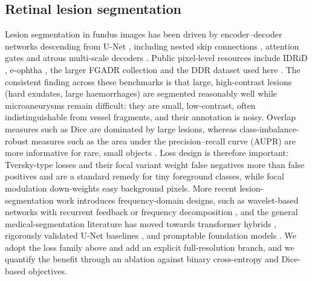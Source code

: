 \subsection{Retinal lesion segmentation}
Lesion segmentation in fundus images has been driven by encoder--decoder networks descending from U-Net \citep{ronneberger2015}, including nested skip connections \citep{zhou2020unetpp}, attention gates \citep{oktay2018} and atrous multi-scale decoders \citep{chen2018deeplab}. Public pixel-level resources include IDRiD \citep{porwal2020idrid}, e-ophtha \citep{decenciere2013teleophta}, the larger FGADR collection \citep{zhou2021fgadr} and the DDR dataset used here \citep{li2019ddr}. The consistent finding across these benchmarks is that large, high-contrast lesions (hard exudates, large haemorrhages) are segmented reasonably well while microaneurysms remain difficult: they are small, low-contrast, often indistinguishable from vessel fragments, and their annotation is noisy. Overlap measures such as Dice are dominated by large lesions, whereas class-imbalance-robust measures such as the area under the precision--recall curve (AUPR) are more informative for rare, small objects \citep{saito2015pr}. Loss design is therefore important: Tversky-type losses \citep{salehi2017tversky} and their focal variant \citep{abraham2019ftl} weight false negatives more than false positives and are a standard remedy for tiny foreground classes, while focal modulation \citep{lin2017focal} down-weights easy background pixels. More recent lesion-segmentation work introduces frequency-domain designs, such as wavelet-based networks with recurrent feedback or frequency decomposition \citep{li2024wsrfnet,li2026wfdenet}, and the general medical-segmentation literature has moved towards transformer hybrids \citep{chen2024transunet}, rigorously validated U-Net baselines \citep{isensee2024nnunetrev}, and promptable foundation models \citep{kirillov2023sam,ma2024medsam}. We adopt the loss family above and add an explicit full-resolution branch, and we quantify the benefit through an ablation against binary cross-entropy and Dice-based objectives.

